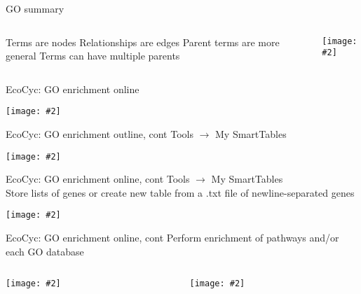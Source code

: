 \documentclass{beamer}
\renewcommand{\c}[1]{\begin{center}#1\end{center}}
\newcommand{\gr}[2][.95]{\c{\texttt{[image: \#2]}}}
\begin{document}
\begin{frame}{GO summary}
    \begin{columns}
        \begin{column}{0.6\textwidth}
            \begin{outline}
                \1 Terms are nodes 
                \1 Relationships are edges 
                \1 Parent terms are more general
                \1 Terms can have multiple parents
            \end{outline}
        \end{column}
        \begin{column}{0.4\textwidth}
            \gr{l7_figs/s13_go.png}
        \end{column}
    \end{columns}
\end{frame}

\begin{frame}{EcoCyc: GO enrichment online}
    \gr{l7_figs/s15_ecocyc1.png}
\end{frame}

\begin{frame}{EcoCyc: GO enrichment outline, cont}
    Tools $\to$ My SmartTables
    \gr[0.7]{l7_figs/s16_smart_tables.png}
\end{frame}

\begin{frame}{EcoCyc: GO enrichment online, cont}
    Tools $\to$ My SmartTables\\
    \bigskip Store lists of genes or create new table from a .txt file of newline-separated genes
    \gr{l7_figs/s17_ecocyc2.png}
\end{frame}

\begin{frame}{EcoCyc: GO enrichment online, cont}
    Perform enrichment of pathways and/or each GO database
    \begin{columns}
        \begin{column}{0.7\textwidth}
            \gr{l7_figs/s18_ecocyc3.png}
        \end{column}
        \begin{column}{0.3\textwidth}
            \gr{l7_figs/s18_ecocyc4.png}
        \end{column}
    \end{columns}
\end{frame}
\end{document}
